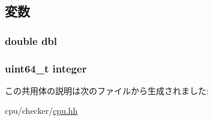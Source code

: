 \subsection{変数}
\hypertarget{unionCheckerCPU_1_1Result_a57291299e530453fdec37a931c728239}{
\subsubsection[{dbl}]{\setlength{\rightskip}{0pt plus 5cm}double {\bf dbl}}}
\label{unionCheckerCPU_1_1Result_a57291299e530453fdec37a931c728239}
\hypertarget{unionCheckerCPU_1_1Result_a88f9f5e1216d6aaa43434facecd25bc4}{
\subsubsection[{integer}]{\setlength{\rightskip}{0pt plus 5cm}uint64\_\-t {\bf integer}}}
\label{unionCheckerCPU_1_1Result_a88f9f5e1216d6aaa43434facecd25bc4}


この共用体の説明は次のファイルから生成されました:\begin{DoxyCompactItemize}
\item 
cpu/checker/\hyperlink{checker_2cpu_8hh}{cpu.hh}\end{DoxyCompactItemize}
